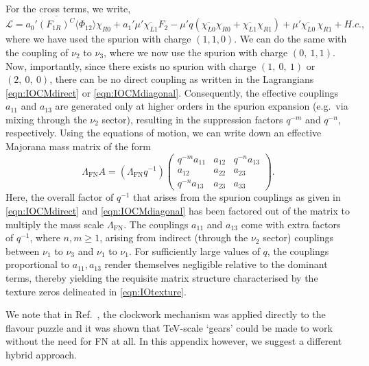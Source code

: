 \documentclass[11pt,letterpaper]{article}
\begin{document}
For the cross terms, we write,
\begin{equation} \label{eqn:IOCMdiagonal}
    \mathcal{L} = a_{0}' \overline{(F_{1R})^C} \langle \Phi_{12}\rangle \chi_{R0} + a_1' \mu '\overline{\chi_{L1}} F_2  - \mu' q(\overline{\chi_{L0}}\chi_{R0} + \overline{\chi_{L1}}\chi_{R1}) + \mu'  \overline{\chi_{L0}} \, \chi_{R1} + H.c.,
\end{equation}
where we have used the spurion with charge $(1,1,0)$. We can do the same
with the coupling of $\nu_2$ to $\nu_3$, where we now use the spurion with
charge $(0,\ 1, 1)$. Now, importantly, since there exists no spurion with
charge $(1,\ 0,\ 1)$ or $(2,\ 0,\ 0)$, there can be no direct coupling as written in
the Lagrangians \cref{eqn:IOCMdirect} or
\cref{eqn:IOCMdiagonal}. Consequently, the effective couplings $a_{11}$ and
$a_{13}$ are generated only at higher orders in the spurion expansion
(e.g.\ via mixing through the $\nu_2$ sector), resulting in the suppression
factors $q^{-m}$ and $q^{-n}$, respectively. Using the equations of motion, we
can write down an effective Majorana mass matrix of the form
\begin{equation}
    \Lambda_{\text{FN}}A = (\Lambda_{\text{FN}} q^{-1})
    \begin{pmatrix}
    q^{-m} a_{11}&a_{12}&q^{-n} a_{13}\\
    
    a_{12} &  a_{22}&  a_{23}\\
    
    q^{-n} a_{13} & a_{23}&a_{33} 
    \end{pmatrix}.
\end{equation}
Here, the overall factor of $q^{-1}$ that arises from the spurion couplings as
given in \cref{eqn:IOCMdirect} and \cref{eqn:IOCMdiagonal} has been factored
out of the matrix to multiply the mass scale $\Lambda_{\text{FN}}$. The couplings $a_{11}$ and
$a_{13}$ come with extra factors of $q^{-1}$, where $n,m \geq 1$, arising from
indirect (through the $\nu_2$ sector) couplings between $\nu_1$ to $\nu_3$ and
$\nu_1$ to $\nu_1$. For sufficiently large values of $q$, the couplings
proportional to $a_{11}, a_{13}$
render themselves 
negligible
relative to the dominant terms, thereby 
yielding the
requisite matrix structure characterised by the texture zeros delineated in \cref{eqn:IOtexture}. 

We note that in Ref.~\cite{Alonso:2018bcg}, the clockwork mechanism was
applied directly to the flavour puzzle and it was shown that TeV-scale `gears'
could be made to work without the need for FN at all. In this appendix
however, we suggest a different hybrid approach.



\end{document}
